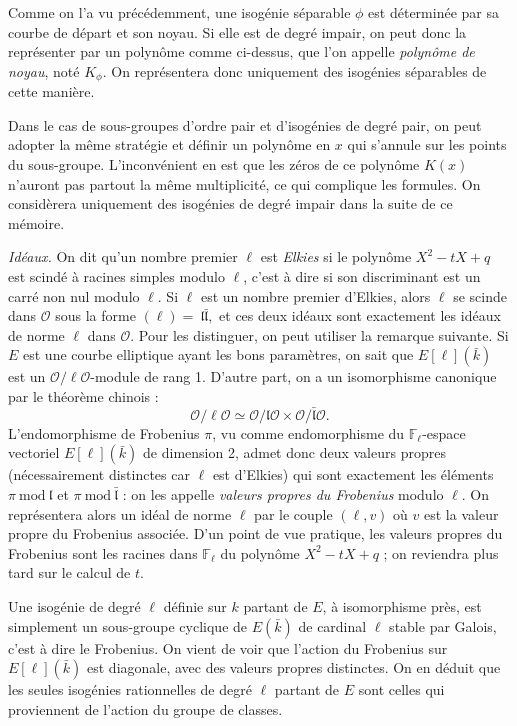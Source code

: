 \documentclass[11pt,a4paper]{article}
\newcommand{\F}{\mathbb{F}}
\renewcommand{\O}{\mathcal{O}}
\renewcommand{\frak}{\mathfrak}
\renewcommand{\mod}{\ \mathrm{mod}\ }
\renewcommand{\v}{\vspace{5mm}}
\theoremstyle{definition}
\begin{document}
Comme on l'a vu précédemment, une isogénie séparable $\phi$ est déterminée par sa courbe de départ et son noyau. Si elle est de degré impair, on peut donc la représenter par un polynôme comme ci-dessus, que l'on appelle \emph{polynôme de noyau}, noté $K_\phi$. On représentera donc uniquement des isogénies séparables de cette manière.

Dans le cas de sous-groupes d'ordre pair et d'isogénies de degré pair, on peut adopter la même stratégie et définir un polynôme en $x$ qui s'annule sur les points du sous-groupe. L'inconvénient en est que les zéros de ce polynôme $K(x)$ n'auront pas partout la même multiplicité, ce qui complique les formules. On considèrera uniquement des isogénies de degré impair dans la suite de ce mémoire. 
\v

\emph{Idéaux.} On dit qu'un nombre premier $\ell$ est \emph{Elkies} si le polynôme $X^2 - tX + q$ est scindé à racines simples modulo $\ell$, c'est à dire si son discriminant est un carré non nul modulo $\ell$. Si $\ell$ est un nombre premier d'Elkies, alors $\ell$ se scinde dans $\O$ sous la forme $(\ell) =~\frak l \bar{\frak l},$
et ces deux idéaux sont exactement les idéaux de norme $\ell$ dans $\O$. Pour les distinguer, on peut utiliser la remarque suivante. Si $E$ est une courbe elliptique ayant les bons paramètres, on sait que $E[\ell](\bar{k})$ est un $\O/\ell\O$-module de rang 1. D'autre part, on a un isomorphisme canonique par le théorème chinois :
$$\O/\ell\O \simeq \O/\frak l \O \times \O/\bar{\frak l} \O.$$
L'endomorphisme de Frobenius $\pi$, vu comme endomorphisme du $\F_\ell$-espace vectoriel $E[\ell](\bar{k})$ de dimension 2, admet donc deux valeurs propres (nécessairement distinctes car $\ell$ est d'Elkies) qui sont exactement les éléments $\pi\mod \frak l$ et $\pi\mod \bar{\frak l}$ : on les appelle \emph{valeurs propres du Frobenius} modulo $\ell$. On représentera alors un idéal de norme $\ell$ par le couple $(\ell, v)$ où $v$ est la valeur propre du Frobenius associée. D'un point de vue pratique, les valeurs propres du Frobenius sont les racines dans $\F_\ell$ du polynôme $X^2 - tX + q$ ; on reviendra plus tard sur le calcul de $t$.

Une isogénie de degré $\ell$ définie sur $k$ partant de $E$, à isomorphisme près, est simplement un sous-groupe cyclique de $E(\bar{k})$ de cardinal $\ell$ stable par Galois, c'est à dire le Frobenius. On vient de voir que l'action du Frobenius sur $E[\ell](\bar{k})$ est diagonale, avec des valeurs propres distinctes. On en déduit que les seules isogénies rationnelles de degré $\ell$ partant de $E$ sont celles qui proviennent de l'action du groupe de classes.
\v
\end{document}

